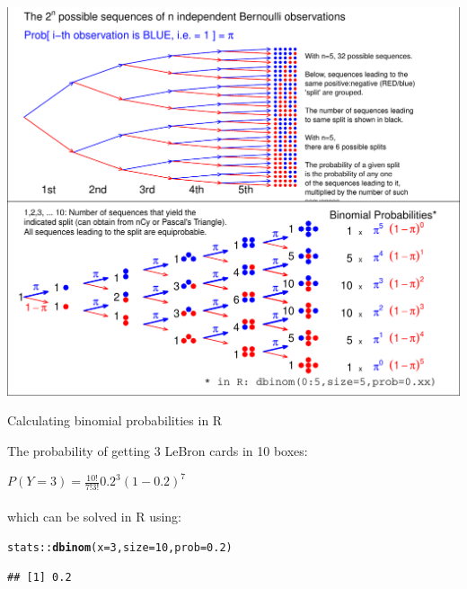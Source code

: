 \documentclass[10pt]{beamer}\usepackage[]{graphicx}\usepackage[]{color}
\makeatletter
\def\maxwidth{ %
  \ifdim\Gin@nat@width>\linewidth
    \linewidth
  \else
    \Gin@nat@width
  \fi
}
\newcommand{\hlnum}[1]{\textcolor[rgb]{0.686,0.059,0.569}{#1}}%
\newcommand{\hlopt}[1]{\textcolor[rgb]{0,0,0}{#1}}%
\newcommand{\hlstd}[1]{\textcolor[rgb]{0.345,0.345,0.345}{#1}}%
\newcommand{\hlkwc}[1]{\textcolor[rgb]{0.333,0.667,0.333}{#1}}%
\newcommand{\hlkwd}[1]{\textcolor[rgb]{0.737,0.353,0.396}{\textbf{#1}}}%
\newenvironment{kframe}{%
 \def\at@end@of@kframe{}%
 \ifinner\ifhmode%
  \def\at@end@of@kframe{\end{minipage}}%
  \begin{minipage}{\columnwidth}%
 \fi\fi%
 \def\FrameCommand##1{\hskip\@totalleftmargin \hskip-\fboxsep
 \colorbox{shadecolor}{##1}\hskip-\fboxsep
     \hskip-\linewidth \hskip-\@totalleftmargin \hskip\columnwidth}%
 \MakeFramed {\advance\hsize-\width
   \@totalleftmargin\z@ \linewidth\hsize
   \@setminipage}}%
 {\par\unskip\endMakeFramed%
 \at@end@of@kframe}
\newenvironment{knitrout}{}{} %
\makeatother
\begin{document}
\begin{frame}[fragile]{}
\begin{knitrout}\tiny
{}\color{fgcolor}

{\centering \includegraphics[width=\maxwidth]{figure/unnamed-chunk-2-1} 

}



\end{knitrout}
\end{frame}


\begin{frame}[fragile]{Calculating binomial probabilities in R}
	
	The probability of getting 3 LeBron cards in 10 boxes:
	
	\vspace{.21in}
	
	$P(Y=3) = \frac{10!}{7!3!}0.2^3(1-0.2)^{7}$ \\ \ \\
	which can be solved in R using:
\begin{knitrout}\tiny
{}\color{fgcolor}\begin{kframe}
\begin{alltt}
\hlstd{stats}\hlopt{::}\hlkwd{dbinom}\hlstd{(}\hlkwc{x} \hlstd{=} \hlnum{3}\hlstd{,} \hlkwc{size} \hlstd{=} \hlnum{10}\hlstd{,} \hlkwc{prob} \hlstd{=} \hlnum{0.2}\hlstd{)}
\end{alltt}
\begin{verbatim}
## [1] 0.2
\end{verbatim}
\end{kframe}
\end{knitrout}
\end{frame}
\end{document}
